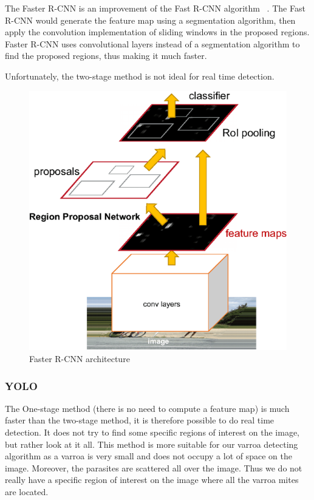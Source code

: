 \documentclass{article}
\begin{document}
The Faster R-CNN is an improvement of the Fast R-CNN algorithm ~\cite{7410526}. The Fast R-CNN would generate the feature map using a segmentation algorithm, then apply the convolution implementation of sliding windows in the proposed regions. Faster R-CNN uses convolutional layers instead of a segmentation algorithm to find the proposed regions, thus making it much faster.

Unfortunately, the two-stage method is not ideal for real time detection.

\begin{figure}[!ht]
  \centering
  \includegraphics[scale = 0.5]{FastRCNN/faster.png}
  \caption{Faster R-CNN architecture ~\cite{ren2015faster}}
  \label{Figure 8}
\end{figure}


\newpage

\subsubsection{YOLO}

The One-stage method (there is no need to compute a feature map) is much faster than the two-stage method, it is therefore possible to do real time detection. It does not try to find some specific regions of interest on the image, but rather look at it all. This method is more suitable for our varroa detecting algorithm as a varroa is very small and does not occupy a lot of space on the image. Moreover, the parasites are scattered all over the image. Thus we do not really have a specific region of interest on the image where all the varroa mites are located.
\end{document}
